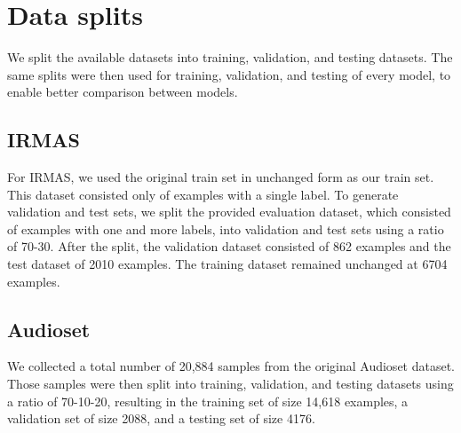 \section{Data splits}

We split the available datasets into training, validation, and testing datasets. The same splits were then used for training, validation, and testing of every model, to enable better comparison between models.

\subsection{IRMAS}
For IRMAS, we used the original train set in unchanged form as our train set. This dataset consisted only of examples with a single label. To generate validation and test sets, we split the provided evaluation dataset, which consisted of examples with one and more labels, into validation and test sets using a ratio of 70-30. After the split, the validation dataset consisted of 862 examples and the test dataset of 2010 examples. The training dataset remained unchanged at 6704 examples. 

\subsection{Audioset}

We collected a total number of 20,884 samples from the original Audioset dataset. Those samples were then split into training, validation, and testing datasets using a ratio of 70-10-20, resulting in the training set of size 14,618 examples, a validation set of size 2088, and a testing set of size 4176.